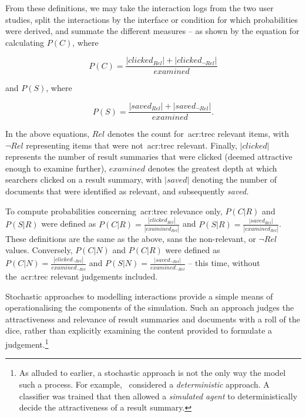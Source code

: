 From these definitions, we may take the interaction logs from the two user studies, split the interactions by the interface or condition for which probabilities were derived, and summate the different measures -- as shown by the equation for calculating $P(C)$, where

\begin{equation}
    P(C) = \frac{|clicked_{Rel}| + |clicked_{\neg Rel}|}{examined}
\end{equation}

and $P(S)$, where

\begin{equation}
    P(S) = \frac{|saved_{Rel}| + | saved_{\neg Rel} |}{examined}.
\end{equation}

In the above equations, $Rel$ denotes the count for~\gls{acr:trec} relevant items, with $\neg Rel$ representing items that were not~\gls{acr:trec} relevant. Finally, $|clicked|$ represents the number of result summaries that were clicked (deemed attractive enough to examine further), $examined$ denotes the greatest depth at which searchers clicked on a result summary, with $|saved|$ denoting the number of documents that were identified as relevant, and subsequently \emph{saved.}

To compute probabilities concerning~\gls{acr:trec} relevance only, $P(C|R)$ and $P(S|R)$ were defined as $P(C|R) = \frac{|clicked_{Rel}|}{|examined_{Rel}|}$ and $P(S|R) = \frac{|saved_{Rel}|}{|examined_{Rel}|}$. These definitions are the same as the above, sans the non-relevant, or $\neg Rel$ values. Conversely, $P(C|N)$ and $P(C|R)$ were defined as $P(C|N) = \frac{|clicked_{\neg Rel}|}{examined_{\neg Rel}}$ and $P(S|N) = \frac{|saved_{\neg Rel}|}{examined_{\neg Rel}}$ -- this time, without the~\gls{acr:trec} relevant judgements included.

Stochastic approaches to modelling interactions provide a simple means of operationalising the components of the simulation. Such an approach judges the attractiveness and relevance of result summaries and documents with a roll of the dice, rather than explicitly examining the content provided to formulate a judgement.\footnote{As alluded to earlier, a stochastic approach is not the only way the model such a process. For example,~\cite{maxwell2016agents} considered a \emph{deterministic} approach. A classifier was trained that then allowed a \emph{simulated agent} to deterministically decide the attractiveness of a result summary.}

